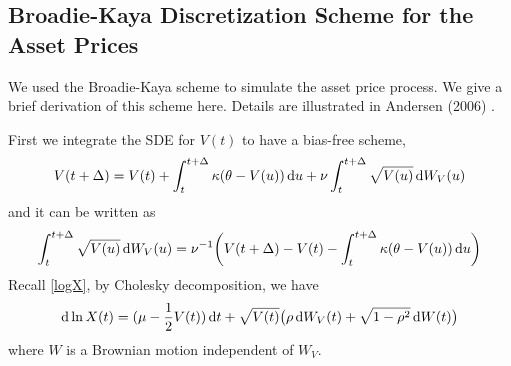 \documentclass{ws-ijfe}
\begin{document}
\subsection{Broadie-Kaya Discretization Scheme for the Asset Prices}

We used the Broadie-Kaya scheme to simulate the asset price process. We give a brief derivation of this scheme here. Details are illustrated in Andersen (2006) \cite{Andersen}.

First we integrate the SDE for $V(t)$ to have a bias-free scheme,
\begin{equation*}
  V(t+\Delta) = V(t)+\int_{t}^{t+\Delta}\kappa(\theta-V(u))\,\mathrm{d} u +\nu\int_{t}^{t+\Delta}\sqrt{V(u)}\,\mathrm{d} W_V(u)
\end{equation*}
and it can be written as
\begin{equation}\label{dW_V}
\int_{t}^{t+\Delta}\sqrt{V(u)}\,\d W_V(u)=\nu^{-1}\bigg(V(t+\Delta)- V(t)-\int_{t}^{t+\Delta}\kappa(\theta-V(u))\,\d u\bigg)
\end{equation}
Recall \eqref{logX}, by Cholesky decomposition, we have
\begin{equation*}
 \mathrm{d} \ln X(t)=(\mu-\frac{1}{2}V(t))\,\mathrm{d} t +\sqrt{V(t)}\big(\rho\,\mathrm{d} W_V(t)+\sqrt{1-\rho^2}\,\mathrm{d} W(t)\big)
\end{equation*}
where $W$ is a Brownian motion independent of $W_V$.
\end{document}
